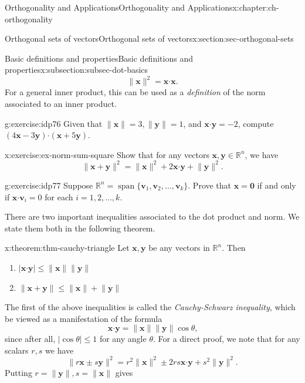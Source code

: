 \documentclass[oneside,10pt,]{book}
\numberwithin{equation}{section}
\newcommand{\spn}{\operatorname{span}}
\newcommand{\R}{\mathbb{R}}
\newcommand{\dotp}{\!\boldsymbol{\cdot}\!}
\newcommand{\len}[1]{\lVert #1\rVert}
\newcommand{\vv}{\mathbf{v}}
\newcommand{\xx}{\mathbf{x}}
\newcommand{\yy}{\mathbf{y}}
\begin{document}
\begin{chapterptx}{Orthogonality and Applications}{}{Orthogonality and Applications}{}{}{x:chapter:ch-orthogonality}
\begin{sectionptx}{Orthogonal sets of vectors}{}{Orthogonal sets of vectors}{}{}{x:section:sec-orthogonal-sets}
\begin{subsectionptx}{Basic definitions and properties}{}{Basic definitions and properties}{}{}{x:subsection:subsec-dot-basics}
\begin{equation*}
\len{\xx}^2 = \xx\dotp \xx\text{.}
\end{equation*}
For a general inner product, this can be used as a \emph{definition} of the norm associated to an inner product.%
\begin{inlineexercise}{}{g:exercise:idp76}%
Given that \(\len{\xx}=3, \len{\yy}=1\), and \(\xx\dotp\yy=-2\), compute \((4\xx-3\yy)\dotp (\xx+5\yy)\).%
\end{inlineexercise}%
\begin{inlineexercise}{}{x:exercise:ex-norm-sum-square}%
Show that for any vectors \(\xx,\yy\in\R^n\), we have%
\begin{equation*}
\len{\xx+\yy}^2 = \len{\xx}^2+2\xx\dotp\yy+\len{\yy}^2\text{.}
\end{equation*}
%
\end{inlineexercise}%
\begin{inlineexercise}{}{g:exercise:idp77}%
Suppose \(\mathbb{R}^n=\spn\{\vv_1,\vv_2,\ldots, \vv_k\}\). Prove that \(\xx=\mathbf{0}\) if and only if \(\xx\dotp \vv_i=0\) for each \(i=1,2,\ldots, k\).%
\end{inlineexercise}%
There are two important inequalities associated to the dot product and norm. We state them both in the following theorem.%
\begin{theorem}{}{}{x:theorem:thm-cauchy-triangle}%
Let \(\xx,\yy\) be any vectors in \(\R^n\). Then%
\begin{enumerate}
\item{}\(\displaystyle \lvert \xx\dotp \yy\rvert \leq \len{\xx}\len{\yy}\)%
\item{}\(\displaystyle \len{\xx+\yy}\leq \len{\xx}+\len{\yy}\)%
\end{enumerate}
%
\end{theorem}
The first of the above inequalities is called the \emph{Cauchy-Schwarz inequality}, which be viewed as a manifestation of the formula%
\begin{equation*}
\xx\dotp \yy = \len{\xx}\len{\yy}\cos\theta\text{,}
\end{equation*}
since after all, \(\lvert \cos\theta\rvert\leq 1\) for any angle \(\theta\). For a direct proof, we note that for any scalars \(r,s\) we have%
\begin{equation*}
\len{r\xx\pm s\yy}^2 = r^2\len{\xx}^2\pm 2rs\xx\dotp\yy+s^2\len{\yy}^2\text{.}
\end{equation*}
Putting \(r=\len{\yy}, s=\len{\xx}\) gives%
\begin{equation*}

\end{equation*}
\end{subsectionptx}
\end{sectionptx}
\end{chapterptx}
\end{document}
